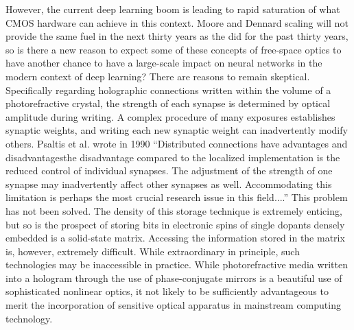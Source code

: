 However, the current deep learning boom is leading to rapid saturation of what CMOS hardware can achieve in this context. Moore and Dennard scaling will not provide the same fuel in the next thirty years as the did for the past thirty years, so is there a new reason to expect some of these concepts of free-space optics to have another chance to have a large-scale impact on neural networks in the modern context of deep learning? There are reasons to remain skeptical. Specifically regarding holographic connections written within the volume of a photorefractive crystal, the strength of each synapse is determined by optical amplitude during writing. A complex procedure of many exposures establishes synaptic weights, and writing each new synaptic weight can inadvertently modify others. Psaltis et al. wrote in 1990 ``Distributed connections have advantages and disadvantages\textemdash the disadvantage compared to the localized implementation is the reduced control of individual synapses. The adjustment of the strength of one synapse may inadvertently affect other synapses as well. Accommodating this limitation is perhaps the most crucial research issue in this field....'' This problem has not been solved. The density of this storage technique is extremely enticing, but so is the prospect of storing bits in electronic spins of single dopants densely embedded is a solid-state matrix. Accessing the information stored in the matrix is, however, extremely difficult. While extraordinary in principle, such technologies may be inaccessible in practice. While photorefractive media written into a hologram through the use of phase-conjugate mirrors is a beautiful use of sophisticated nonlinear optics, it not likely to be sufficiently advantageous to merit the incorporation of sensitive optical apparatus in mainstream computing technology.

